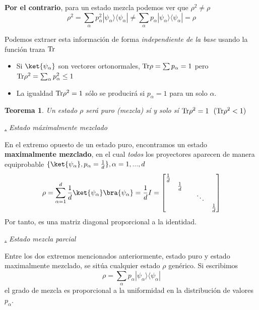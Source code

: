 \documentclass[a4paper,11pt]{book} %
\newtheorem{teorema_contador}{Teorema}
\newcommand{\Teorema}[1]{
		\begin{mybox_gray2}{}
			\begin{teorema_contador}
				 #1 
			\end{teorema_contador} 
		\end{mybox_gray2}
	}
\numberwithin{equation}{chapter}
\newcommand{\ketbra}[2]{| #1\rangle \! \langle #2|}
\def\subsubiContadorIt{\par\addtocounter{subsubsection}{1}\underline{\it\thesubsubsection.}\hskip0.5cm \setcounter{subsubsubsectionIt}{0}}
\newcommand{\SubsubiIt}[1]{
		\subsubiContadorIt \textit{#1}
	}
\newcounter{subsubsubsectionIt}[subsubsection]
\begin{document}
\textbf{Por el contrario}, para un estado mezcla podemos ver que $\rho^2 \neq \rho$
	\begin{equation}
	\rho^2  = \sum_\alpha p_\alpha^2 \ketbra{\psi_\alpha}{\psi_\alpha} \neq  \sum_\alpha p_\alpha \ketbra{\psi_\alpha}{\psi_\alpha} = \rho
	\end{equation}

Podemos extraer esta información de forma \textit{independiente de la base} usando la función traza  ${\rm Tr}$
\begin{itemize}
	\item Si $\ket{\psi_\alpha}$ son vectores ortonormales,  ${\rm Tr } \rho = \sum p_\alpha = 1$ pero  ${\rm Tr }\rho^2 = \sum_\alpha p_\alpha^2\leq 1$
	
	\item La igualdad ${\rm Tr} \rho^2=1$ sólo se producirá si  $p_\alpha = 1$ para un solo $\alpha$. 
\end{itemize}

	\Teorema{
	Un estado  $\rho$ será \textit{puro} (\textit{mezcla}) sí y solo sí ${\rm Tr } \rho^2 = 1~~
 ({\rm Tr } \rho^2 <1)$  
	}


			\SubsubiIt{Estado máximalmente mezclado}

En el extremo opuesto de un estado puro, encontramos un estado \textbf{maximalmente mezclado}, en el cual \textit{todos} los proyectores aparecen de manera equiprobable $\{\ket{\psi_\alpha},p_\alpha = \frac{1}{d}\}, \alpha = 1,...,d$
	\begin{equation}
	\rho = \sum_{\alpha=1}^d \frac{1}{d} \ket{\psi_\alpha}\bra{\psi_\alpha} = \frac{1}{d} I = \begin{bmatrix}\frac{1}{d} &  & & \\ & \frac{1}{d} &  &\\ & & &\ddots & \\ & & & & \frac{1}{d} \end{bmatrix}
	\end{equation}
Por tanto, es una matriz diagonal proporcional a la identidad.


			\SubsubiIt{Estado mezcla parcial}

Entre los dos extremos mencionados anteriormente, estado puro y estado maximalmente mezclado, se sitúa cualquier estado $\rho$ genérico. Si escribimos
	\begin{equation}
	\rho = \sum_{\alpha} p_\alpha \ketbra{\psi_\alpha}{\psi_\alpha}
	\end{equation}
el grado de mezcla es proporcional a la uniformidad en la distribución de valores $p_\alpha$. 
\end{document}
